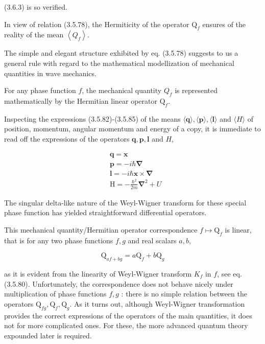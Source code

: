 \documentclass{article}
\begin{document}
(3.6.3) is so verified.

In view of relation (3.5.78), the Hermiticity of the operator $\mathrm{Q}_{f}$ ensures of the reality of the mean $\left\langle Q_{f}\right\rangle$.

The simple and elegant structure exhibited by eq. (3.5.78) suggests to us a general rule with regard to the mathematical modellization of mechanical quantities in wave mechanics.

For any phase function $f$, the mechanical quantity $Q_{f}$ is represented mathematically by the Hermitian linear operator $\mathrm{Q}_{f}$.

Inspecting the expressions (3.5.82)-(3.5.85) of the means $\langle\boldsymbol{q}\rangle,\langle\boldsymbol{p}\rangle,\langle\boldsymbol{l}\rangle$ and $\langle H\rangle$ of position, momentum, angular momentum and energy of a copy, it is immediate to read off the expressions of the operators $\mathbf{q}, \mathbf{p}, \mathbf{l}$ and $H$,
 
\begin{align*}
& \mathbf{q}=\boldsymbol{x}  \tag{3.6.8}\\
& \mathbf{p}=-i \hbar \boldsymbol{\nabla}  \tag{3.6.9}\\
& \mathbf{l}=-i \hbar \boldsymbol{x} \times \boldsymbol{\nabla}  \tag{3.6.10}\\
& \mathrm{H}=-\frac{\hbar^{2}}{2 m} \boldsymbol{\nabla}^{2}+U \tag{3.6.11}
\end{align*}
 

The singular delta-like nature of the Weyl-Wigner transform for these special phase function has yielded straightforward differential operators.

This mechanical quantity/Hermitian operator correspondence $f \mapsto \mathrm{Q}_{f}$ is linear, that is for any two phase functions $f, g$ and real scalars $a, b$,
 
\begin{equation*}
\mathrm{Q}_{a f+b g}=a \mathrm{Q}_{f}+b \mathrm{Q}_{g} \tag{3.6.12}
\end{equation*}
 
as it is evident from the linearity of Weyl-Wigner transform $K_{f}$ in $f$, see eq. (3.5.80). Unfortunately, the correspondence does not behave nicely under multiplication of phase functions $f, g$ : there is no simple relation between the operators $\mathrm{Q}_{f g}, \mathrm{Q}_{f}, \mathrm{Q}_{g}$. As it turns out, although Weyl-Wigner transformation provides the correct expressions of the operators of the main quantities, it does not for more complicated ones. For these, the more advanced quantum theory expounded later is required.
\end{document}
